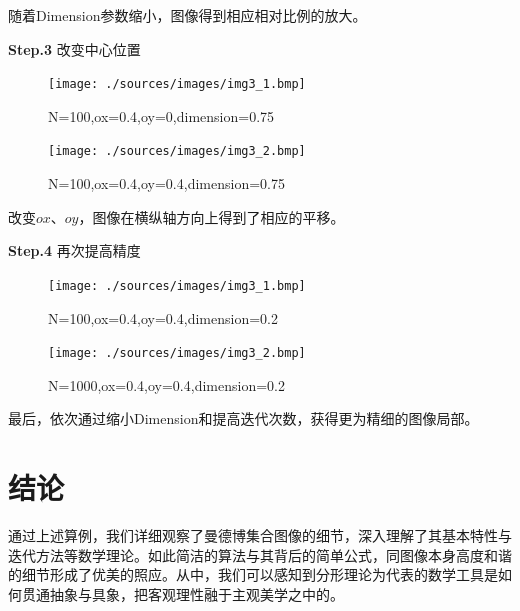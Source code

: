\documentclass{ctexart}
\begin{document}
随着Dimension参数缩小，图像得到相应相对比例的放大。

\textbf{Step.3} 改变中心位置

\begin{figure}[htb]
\centering
\begin{minipage}{0.48\linewidth}
\centering
\texttt{[image: ./sources/images/img3\_1.bmp]}
\caption{N=100,ox=0.4,oy=0,dimension=0.75}
\end{minipage}\hfill
\begin{minipage}{0.48\linewidth}
\centering
\texttt{[image: ./sources/images/img3\_2.bmp]}
\caption{N=100,ox=0.4,oy=0.4,dimension=0.75}
\end{minipage}
\end{figure}

改变$ox$、$oy$，图像在横纵轴方向上得到了相应的平移。

\textbf{Step.4} 再次提高精度

\begin{figure}[htb]
\centering
\begin{minipage}{0.48\linewidth}
\centering
\texttt{[image: ./sources/images/img3\_1.bmp]}
\caption{N=100,ox=0.4,oy=0.4,dimension=0.2}
\end{minipage}\hfill
\begin{minipage}{0.48\linewidth}
\centering
\texttt{[image: ./sources/images/img3\_2.bmp]}
\caption{N=1000,ox=0.4,oy=0.4,dimension=0.2}
\end{minipage}
\end{figure}

最后，依次通过缩小Dimension和提高迭代次数，获得更为精细的图像局部。

\section{结论}

通过上述算例，我们详细观察了曼德博集合图像的细节，深入理解了其基本特性与迭代方法等数学理论。如此简洁的算法与其背后的简单公式，同图像本身高度和谐的细节形成了优美的照应。从中，我们可以感知到分形理论为代表的数学工具是如何贯通抽象与具象，把客观理性融于主观美学之中的。



\end{document}
